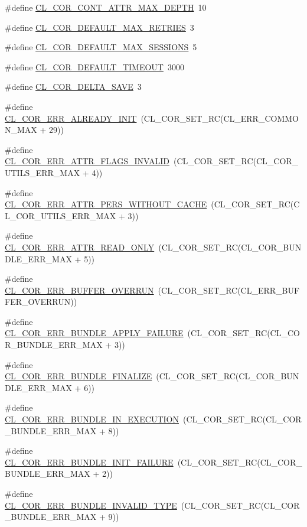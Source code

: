 \begin{CompactItemize}
\item 
\#define \hyperlink{group__group13_ga294}{CL\_\-COR\_\-CONT\_\-ATTR\_\-MAX\_\-DEPTH}~10
\item 
\#define \hyperlink{group__group13_ga278}{CL\_\-COR\_\-DEFAULT\_\-MAX\_\-RETRIES}~3
\item 
\#define \hyperlink{group__group13_ga277}{CL\_\-COR\_\-DEFAULT\_\-MAX\_\-SESSIONS}~5
\item 
\#define \hyperlink{group__group13_ga279}{CL\_\-COR\_\-DEFAULT\_\-TIMEOUT}~3000
\item 
\#define \hyperlink{group__group13_ga284}{CL\_\-COR\_\-DELTA\_\-SAVE}~3
\item 
\#define \hyperlink{group__group13_ga184}{CL\_\-COR\_\-ERR\_\-ALREADY\_\-INIT}~(CL\_\-COR\_\-SET\_\-RC(CL\_\-ERR\_\-COMMON\_\-MAX + 29))
\item 
\#define \hyperlink{group__group13_ga244}{CL\_\-COR\_\-ERR\_\-ATTR\_\-FLAGS\_\-INVALID}~(CL\_\-COR\_\-SET\_\-RC(CL\_\-COR\_\-UTILS\_\-ERR\_\-MAX + 4))
\item 
\#define \hyperlink{group__group13_ga243}{CL\_\-COR\_\-ERR\_\-ATTR\_\-PERS\_\-WITHOUT\_\-CACHE}~(CL\_\-COR\_\-SET\_\-RC(CL\_\-COR\_\-UTILS\_\-ERR\_\-MAX + 3))
\item 
\#define \hyperlink{group__group13_ga251}{CL\_\-COR\_\-ERR\_\-ATTR\_\-READ\_\-ONLY}~(CL\_\-COR\_\-SET\_\-RC(CL\_\-COR\_\-BUNDLE\_\-ERR\_\-MAX + 5))
\item 
\#define \hyperlink{group__group13_ga152}{CL\_\-COR\_\-ERR\_\-BUFFER\_\-OVERRUN}~(CL\_\-COR\_\-SET\_\-RC(CL\_\-ERR\_\-BUFFER\_\-OVERRUN))
\item 
\#define \hyperlink{group__group13_ga249}{CL\_\-COR\_\-ERR\_\-BUNDLE\_\-APPLY\_\-FAILURE}~(CL\_\-COR\_\-SET\_\-RC(CL\_\-COR\_\-BUNDLE\_\-ERR\_\-MAX + 3))
\item 
\#define \hyperlink{group__group13_ga252}{CL\_\-COR\_\-ERR\_\-BUNDLE\_\-FINALIZE}~(CL\_\-COR\_\-SET\_\-RC(CL\_\-COR\_\-BUNDLE\_\-ERR\_\-MAX + 6))
\item 
\#define \hyperlink{group__group13_ga254}{CL\_\-COR\_\-ERR\_\-BUNDLE\_\-IN\_\-EXECUTION}~(CL\_\-COR\_\-SET\_\-RC(CL\_\-COR\_\-BUNDLE\_\-ERR\_\-MAX + 8))
\item 
\#define \hyperlink{group__group13_ga248}{CL\_\-COR\_\-ERR\_\-BUNDLE\_\-INIT\_\-FAILURE}~(CL\_\-COR\_\-SET\_\-RC(CL\_\-COR\_\-BUNDLE\_\-ERR\_\-MAX + 2))
\item 
\#define \hyperlink{group__group13_ga255}{CL\_\-COR\_\-ERR\_\-BUNDLE\_\-INVALID\_\-TYPE}~(CL\_\-COR\_\-SET\_\-RC(CL\_\-COR\_\-BUNDLE\_\-ERR\_\-MAX + 9))

\end{CompactItemize}
